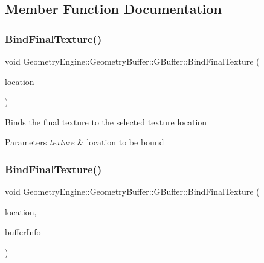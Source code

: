 \subsection{Member Function Documentation}
\mbox{\label{class_geometry_engine_1_1_geometry_buffer_1_1_g_buffer_ad64fb7191a7dc256b1282a7f1deab756}} 
\subsubsection{\texorpdfstring{BindFinalTexture()}{BindFinalTexture()}\hspace{0.1cm}{\footnotesize\ttfamily [1/2]}}
{\footnotesize\ttfamily void Geometry\+Engine\+::\+Geometry\+Buffer\+::\+G\+Buffer\+::\+Bind\+Final\+Texture (\begin{DoxyParamCaption}\item[{\mbox{\hyperlink{class_geometry_engine_1_1_geometry_buffer_1_1_g_buffer_a718dceafcac1915f7de061108597e1cc}{G\+B\+U\+F\+F\+E\+R\+\_\+\+T\+E\+X\+T\+U\+R\+E\+\_\+\+T\+Y\+PE}}}]{location }\end{DoxyParamCaption})}

Binds the final texture to the selected texture location 
\begin{DoxyParams}{Parameters}
{\em texture} & location to be bound \\
\hline
\end{DoxyParams}
\mbox{\label{class_geometry_engine_1_1_geometry_buffer_1_1_g_buffer_a710627a05fa69f6aa98ee6d90ab57e85}} 
\subsubsection{\texorpdfstring{BindFinalTexture()}{BindFinalTexture()}\hspace{0.1cm}{\footnotesize\ttfamily [2/2]}}
{\footnotesize\ttfamily void Geometry\+Engine\+::\+Geometry\+Buffer\+::\+G\+Buffer\+::\+Bind\+Final\+Texture (\begin{DoxyParamCaption}\item[{\mbox{\hyperlink{class_geometry_engine_1_1_geometry_buffer_1_1_g_buffer_a718dceafcac1915f7de061108597e1cc}{G\+B\+U\+F\+F\+E\+R\+\_\+\+T\+E\+X\+T\+U\+R\+E\+\_\+\+T\+Y\+PE}}}]{location,  }\item[{\mbox{\hyperlink{class_geometry_engine_1_1_g_buffer_texture_info}{G\+Buffer\+Texture\+Info}} \&}]{buffer\+Info }\end{DoxyParamCaption})}

